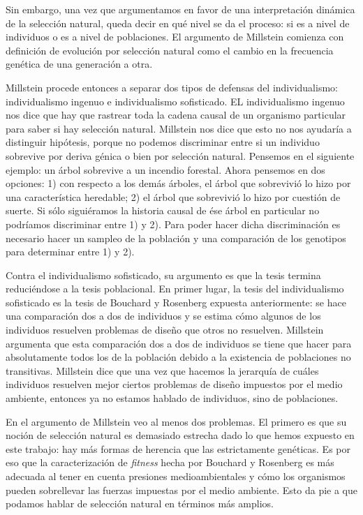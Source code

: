 Sin embargo, una vez que argumentamos en favor de una interpretación dinámica de la selección natural, queda decir en qué nivel se da el proceso: si es a nivel de individuos o es a nivel de poblaciones. El argumento de Millstein comienza con definición de evolución por selección natural como el cambio en la frecuencia genética de una generación a otra.

Millstein procede entonces a separar dos tipos de defensas del individualismo: individualismo ingenuo e individualismo sofisticado. EL individualismo ingenuo nos dice que hay que rastrear toda la cadena causal de un organismo particular para saber si hay selección natural. Millstein nos dice que esto no nos ayudaría a distinguir hipótesis, porque no podemos discriminar entre si un individuo sobrevive por deriva génica o bien por selección natural. Pensemos en el siguiente ejemplo: un árbol sobrevive a un incendio forestal. Ahora pensemos en dos opciones: 1) con respecto a los demás árboles, el árbol que sobrevivió lo hizo por una característica heredable; 2) el árbol que sobrevivió lo hizo por cuestión de suerte. Si sólo siguiéramos la historia causal de ése árbol en particular no podríamos discriminar entre 1) y 2). Para poder hacer dicha discriminación es necesario hacer un sampleo de la población y una comparación de los genotipos para determinar entre 1) y 2).

Contra el individualismo sofisticado, su argumento es que la tesis termina reduciéndose a la tesis poblacional. En primer lugar, la tesis del individualismo sofisticado es la tesis de Bouchard y Rosenberg expuesta anteriormente: se hace una comparación dos a dos de individuos y se estima cómo algunos de los individuos resuelven problemas de diseño que otros no resuelven. Millstein argumenta que esta comparación dos a dos de individuos se tiene que hacer para absolutamente todos los de la población debido a la existencia de poblaciones no transitivas. Millstein dice que una vez que hacemos la jerarquía de cuáles individuos resuelven mejor ciertos problemas de diseño impuestos por el medio ambiente, entonces ya no estamos hablado de individuos, sino de poblaciones.

En el argumento de Millstein veo al menos dos problemas. El primero es que su noción de selección natural es demasiado estrecha dado lo que hemos expuesto en este trabajo: hay más formas de herencia que las estrictamente genéticas. Es por eso que la caracterización de \emph{fitness} hecha por Bouchard y Rosenberg es más adecuada al tener en cuenta presiones medioambientales y cómo los organismos pueden sobrellevar las fuerzas impuestas por el medio ambiente. Esto da pie a que podamos hablar de selección natural en términos más amplios.

